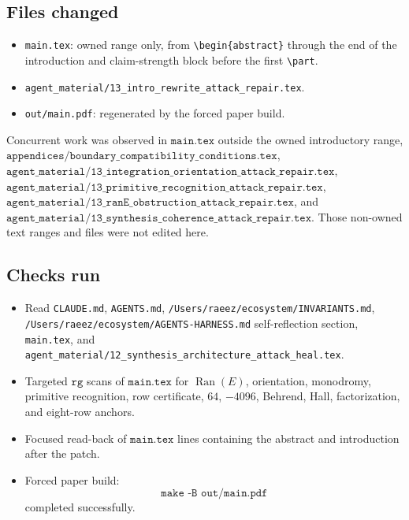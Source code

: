 \subsection{Files changed}

\begin{itemize}
\item \texttt{main.tex}: owned range only, from
\verb|\begin{abstract}| through the end of the introduction and
claim-strength block before the first \verb|\part|.
\item \texttt{agent\_material/13\_intro\_rewrite\_attack\_repair.tex}.
\item \texttt{out/main.pdf}: regenerated by the forced paper build.
\end{itemize}

Concurrent work was observed in \(\texttt{main.tex}\) outside the owned
introductory range,
\(\texttt{appendices/boundary\_compatibility\_conditions.tex}\),
\(\texttt{agent\_material/13\_integration\_orientation\_attack\_repair.tex}\),
\(\texttt{agent\_material/13\_primitive\_recognition\_attack\_repair.tex}\),
\(\texttt{agent\_material/13\_ranE\_obstruction\_attack\_repair.tex}\),
and
\(\texttt{agent\_material/13\_synthesis\_coherence\_attack\_repair.tex}\).
Those non-owned text ranges and files were not edited here.

\subsection{Checks run}

\begin{itemize}
\item Read \texttt{CLAUDE.md}, \texttt{AGENTS.md},
\texttt{/Users/raeez/ecosystem/INVARIANTS.md},
\texttt{/Users/raeez/ecosystem/AGENTS-HARNESS.md} self-reflection
section, \texttt{main.tex}, and
\texttt{agent\_material/12\_synthesis\_architecture\_attack\_heal.tex}.
\item Targeted \(\texttt{rg}\) scans of \(\texttt{main.tex}\) for
\(\operatorname{Ran}(E)\), orientation, monodromy, primitive
recognition, row certificate, \(64\), \(-4096\), Behrend, Hall,
factorization, and eight-row anchors.
\item Focused read-back of \(\texttt{main.tex}\) lines containing the
abstract and introduction after the patch.
\item Forced paper build:
\[
\texttt{make -B out/main.pdf}
\]
completed successfully.
\end{itemize}

